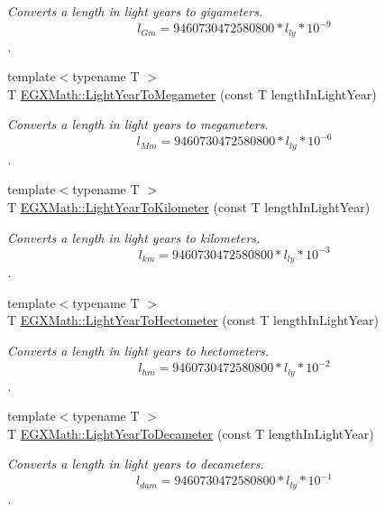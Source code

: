\begin{DoxyCompactItemize}
\begin{DoxyCompactList}\small\item\em Converts a length in light years to gigameters. \[ l_{Gm}=9460730472580800 * l_{ly} * 10^{-9} \]. \end{DoxyCompactList}\item 
{\footnotesize template$<$typename T $>$ }\\T \mbox{\hyperlink{group___e_g_x_math-_conversions-_length_conversions-_astronomical-_light_year-_s_i_ga55603d7948429b49c2942b228c1376ed}{E\+G\+X\+Math\+::\+Light\+Year\+To\+Megameter}} (const T length\+In\+Light\+Year)
\begin{DoxyCompactList}\small\item\em Converts a length in light years to megameters. \[ l_{Mm}=9460730472580800 * l_{ly} * 10^{-6} \]. \end{DoxyCompactList}\item 
{\footnotesize template$<$typename T $>$ }\\T \mbox{\hyperlink{group___e_g_x_math-_conversions-_length_conversions-_astronomical-_light_year-_s_i_gae13805b5330d0024a1845884a84fd076}{E\+G\+X\+Math\+::\+Light\+Year\+To\+Kilometer}} (const T length\+In\+Light\+Year)
\begin{DoxyCompactList}\small\item\em Converts a length in light years to kilometers. \[ l_{km}=9460730472580800 * l_{ly} * 10^{-3} \]. \end{DoxyCompactList}\item 
{\footnotesize template$<$typename T $>$ }\\T \mbox{\hyperlink{group___e_g_x_math-_conversions-_length_conversions-_astronomical-_light_year-_s_i_ga50631edbbd7f5eef1f092138657c725e}{E\+G\+X\+Math\+::\+Light\+Year\+To\+Hectometer}} (const T length\+In\+Light\+Year)
\begin{DoxyCompactList}\small\item\em Converts a length in light years to hectometers. \[ l_{hm}=9460730472580800 * l_{ly} * 10^{-2} \]. \end{DoxyCompactList}\item 
{\footnotesize template$<$typename T $>$ }\\T \mbox{\hyperlink{group___e_g_x_math-_conversions-_length_conversions-_astronomical-_light_year-_s_i_gad178f20a1bc896b522fc17f636fbfdc0}{E\+G\+X\+Math\+::\+Light\+Year\+To\+Decameter}} (const T length\+In\+Light\+Year)
\begin{DoxyCompactList}\small\item\em Converts a length in light years to decameters. \[ l_{dam}=9460730472580800 * l_{ly} * 10^{-1} \]. \end{DoxyCompactList}\item 

\end{DoxyCompactItemize}
